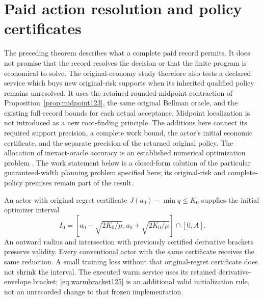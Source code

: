 \section{Paid action resolution and policy certificates}
\label{sec:paidresolution125}

The preceding theorem describes what a complete paid record permits.
It does not promise that the record resolves the decision or that the
finite program is economical to solve. The original-economy study therefore
also tests a declared service which buys new original-risk supports when
its inherited qualified policy remains unresolved. It uses the retained
rounded-midpoint contraction of Proposition~\ref{prop:midpoint123}, the
same original Bellman oracle, and the existing full-record bounds for
each actual acceptance. Midpoint localization is not introduced as a new
root-finding principle. The additions here connect its required support
precision, a complete work bound, the actor's initial economic certificate,
and the separate precision of the returned original policy.
The allocation of inexact-oracle accuracy is an established numerical
optimization problem \citep{DGN2014Inexact122,VanDesselGlineur2024}.
The work statement below is a closed-form solution of the particular
guaranteed-width planning problem specified here; its original-risk and
complete-policy premises remain part of the result.

An actor with original regret certificate
$J(a_0)-\min q\le K_0$ supplies the initial optimizer interval
\begin{equation}\label{eq:warmbracket125}
 I_0=[a_0-\sqrt{2K_0/\mu},a_0+\sqrt{2K_0/\mu}]\cap[0,A].
\end{equation}
An outward radius and intersection with previously certified derivative
brackets preserve validity. Every conventional actor with the same
certificate receives the same reduction. A small training loss without
that original-regret certificate does not shrink the interval.
The executed warm service uses its retained derivative-envelope bracket;
\eqref{eq:warmbracket125} is an additional valid initialization rule,
not an unrecorded change to that frozen implementation.

